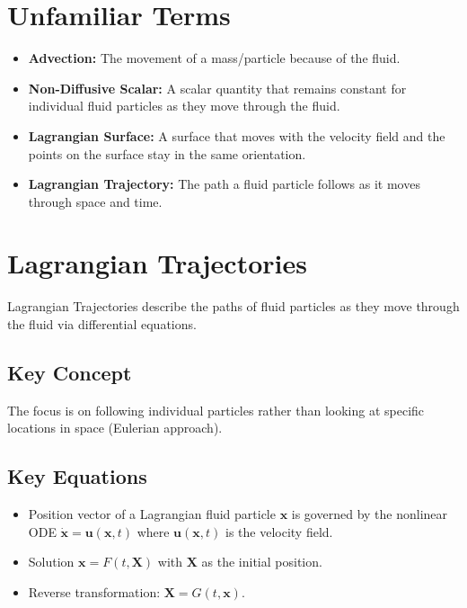 \documentclass{article}
\begin{document}
\section{Unfamiliar Terms}
\begin{itemize}
    \item \textbf{Advection:} The movement of a mass/particle because of the fluid.
    \item \textbf{Non-Diffusive Scalar:} A scalar quantity that remains constant for individual fluid particles as they move through the fluid.
    \item \textbf{Lagrangian Surface:} A surface that moves with the velocity field and the points on the surface stay in the same orientation.
    \item \textbf{Lagrangian Trajectory:} The path a fluid particle follows as it moves through space and time.
\end{itemize}

\section{Lagrangian Trajectories}
Lagrangian Trajectories describe the paths of fluid particles as they move through the fluid via differential equations.

\subsection{Key Concept}
The focus is on following individual particles rather than looking at specific locations in space (Eulerian approach).

\subsection{Key Equations}
\begin{itemize}
    \item Position vector of a Lagrangian fluid particle $\mathbf{x}$ is governed by the nonlinear ODE $\dot{\mathbf{x}} = \mathbf{u}(\mathbf{x}, t)$ where $\mathbf{u}(\mathbf{x}, t)$ is the velocity field.
    \item Solution $\mathbf{x} = F(t, \mathbf{X})$ with $\mathbf{X}$ as the initial position.
    \item Reverse transformation: $\mathbf{X} = G(t, \mathbf{x})$.
\end{itemize}
\end{document}
